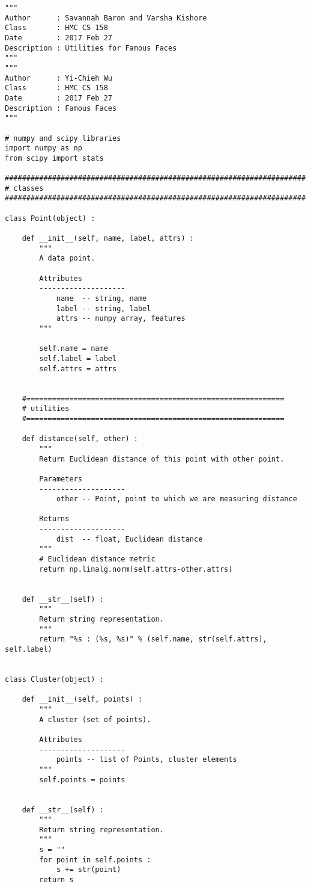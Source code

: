 \documentclass[11pt]{article}
\begin{document}
\begin{verbatim}
"""
Author      : Savannah Baron and Varsha Kishore
Class       : HMC CS 158
Date        : 2017 Feb 27
Description : Utilities for Famous Faces
"""
"""
Author      : Yi-Chieh Wu
Class       : HMC CS 158
Date        : 2017 Feb 27
Description : Famous Faces
"""

# numpy and scipy libraries
import numpy as np
from scipy import stats

######################################################################
# classes
######################################################################

class Point(object) :
    
    def __init__(self, name, label, attrs) :
        """
        A data point.
        
        Attributes
        --------------------
            name  -- string, name
            label -- string, label
            attrs -- numpy array, features
        """
        
        self.name = name
        self.label = label
        self.attrs = attrs
    
    
    #============================================================
    # utilities
    #============================================================
    
    def distance(self, other) :
        """
        Return Euclidean distance of this point with other point.
        
        Parameters
        --------------------
            other -- Point, point to which we are measuring distance
        
        Returns
        --------------------
            dist  -- float, Euclidean distance
        """
        # Euclidean distance metric
        return np.linalg.norm(self.attrs-other.attrs)
    
    
    def __str__(self) :
        """
        Return string representation.
        """
        return "%s : (%s, %s)" % (self.name, str(self.attrs), self.label)


class Cluster(object) :
    
    def __init__(self, points) :
        """
        A cluster (set of points).
        
        Attributes
        --------------------
            points -- list of Points, cluster elements
        """        
        self.points = points
    
    
    def __str__(self) :
        """
        Return string representation.
        """
        s = ""
        for point in self.points :
            s += str(point)
        return s
        

\end{verbatim}
\end{document}
